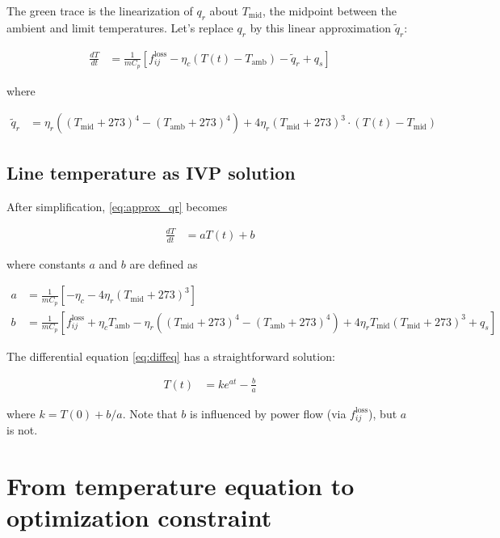\documentclass[conference]{IEEEtran}
\begin{document}
The green trace is the linearization of $q_r$ about $T_\text{mid}$, the midpoint between the ambient and limit temperatures. Let's replace $q_r$ by this linear approximation $\tilde{q}_r$:

\begin{align}\label{eq:approx_qr}
\frac{dT}{dt} &= \frac{1}{mC_p}\left[ f_{ij}^\text{loss} - \eta_c\left( T(t) - T_\text{amb}\right) - \tilde{q}_r + q_s \right]
\end{align}

where

\begin{align}
\tilde{q}_r &= \eta_r  \left( (T_\text{mid} + 273)^4 - (T_\text{amb} + 273)^4\right) + 4\eta_r(T_\text{mid} + 273)^3\cdot(T(t) - T_\text{mid})
\end{align}


\subsection{Line temperature as IVP solution}
After simplification, \eqref{eq:approx_qr} becomes

\begin{align}\label{eq:diffeq}
\frac{dT}{dt} &= aT(t) + b
\end{align}

where constants $a$ and $b$ are defined as

\begin{subequations}
\begin{align}
a &= \frac{1}{mC_p} \left[ -\eta_c - 4\eta_r(T_\text{mid} + 273)^3 \right] \\
b &= \frac{1}{mC_p} \left[ f_{ij}^\text{loss} + \eta_cT_\text{amb} - \eta_r \left( (T_\text{mid} + 273)^4 - (T_\text{amb} + 273)^4 \right) + 4\eta_rT_\text{mid}(T_\text{mid} + 273)^3 + q_s \right]
\end{align}
\end{subequations}

The differential equation \eqref{eq:diffeq} has a straightforward solution:

\begin{align}\label{eq:tivp}
T(t) &= ke^{at} - \frac{b}{a}
\end{align}

where $k=T(0) + b/a$. Note that $b$ is influenced by power flow (via
$f_{ij}^\text{loss}$), but $a$ is not.

\section{From temperature equation to optimization constraint}\label{from-ivp-to-optimization-constraint}
\end{document}
